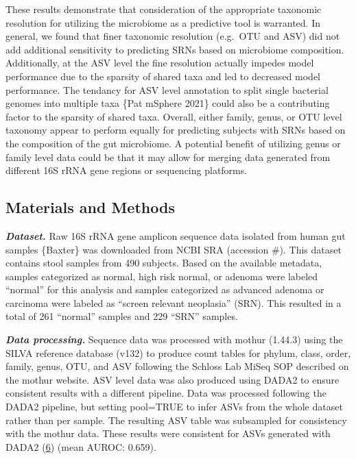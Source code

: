 \documentclass[
]{article}
\begin{document}
These results demonstrate that consideration of the appropriate
taxonomic resolution for utilizing the microbiome as a predictive tool
is warranted. In general, we found that finer taxonomic resolution
(e.g.~OTU and ASV) did not add additional sensitivity to predicting SRNs
based on microbiome composition. Additionally, at the ASV level the fine
resolution actually impedes model performance due to the sparsity of
shared taxa and led to decreased model performance. The tendancy for ASV
level annotation to split single bacterial genomes into multiple taxa
\{Pat mSphere 2021\} could also be a contributing factor to the sparsity
of shared taxa. Overall, either family, genus, or OTU level taxonomy
appear to perform equally for predicting subjects with SRNs based on the
composition of the gut microbiome. A potential benefit of utilizing
genus or family level data could be that it may allow for merging data
generated from different 16S rRNA gene regions or sequencing platforms.

\hypertarget{materials-and-methods}{%
\subsection{Materials and Methods}\label{materials-and-methods}}

\textbf{\emph{Dataset.}} Raw 16S rRNA gene amplicon sequence data
isolated from human gut samples \{Baxter\} was downloaded from NCBI SRA
(accession \#). This dataset contains stool samples from 490 subjects.
Based on the available metadata, samples categorized as normal, high
risk normal, or adenoma were labeled ``normal'' for this analysis and
samples categorized as advanced adenoma or carcinoma were labeled as
``screen relevant neoplasia'' (SRN). This resulted in a total of 261
``normal'' samples and 229 ``SRN'' samples.

\textbf{\emph{Data processing.}} Sequence data was processed with mothur
(1.44.3) using the SILVA reference database (v132) to produce count
tables for phylum, class, order, family, genus, OTU, and ASV following
the Schloss Lab MiSeq SOP described on the mothur website. ASV level
data was also produced using DADA2 to ensure consistent results with a
different pipeline. Data was processed following the DADA2 pipeline, but
setting pool=TRUE to infer ASVs from the whole dataset rather than per
sample. The resulting ASV table was subsampled for consistency with the
mothur data. These results were consistent for ASVs generated with DADA2
(\protect\hyperlink{ref-callahan2016}{6}) (mean AUROC: 0.659).
\end{document}
